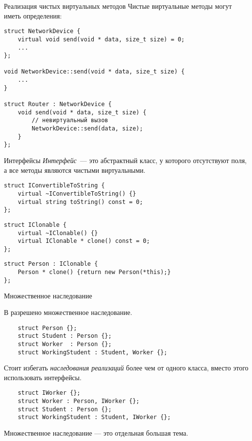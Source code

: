 \documentclass{beamer}
\begin{document}
\begin{frame}[fragile]{Реализация чистых виртуальных методов}
    Чистые виртуальные методы могут иметь определения:
    \begin{lstlisting}[basicstyle=\fontsize{9pt}{1em}\ttfamily,commentstyle=\fontsize{9pt}{1em}\ttfamily\color{MOOCGreen}]
struct NetworkDevice {
    virtual void send(void * data, size_t size) = 0;
    ...
};

void NetworkDevice::send(void * data, size_t size) {
    ...
}

struct Router : NetworkDevice {
    void send(void * data, size_t size) {
        // невиртуальный вызов
        NetworkDevice::send(data, size);
    }
};
    \end{lstlisting}
\end{frame}

\begin{frame}[fragile]{Интерфейсы}{}
    {\em Интерфейс}~— это абстрактный класс, у которого отсутствуют поля,
    а все методы являются чистыми виртуальными.

    \begin{lstlisting}
struct IConvertibleToString {
    virtual ~IConvertibleToString() {}
    virtual string toString() const = 0;
};
    \end{lstlisting}
    \begin{lstlisting}
struct IClonable {
    virtual ~IClonable() {}
    virtual IClonable * clone() const = 0;
};
    \end{lstlisting}
    \begin{lstlisting}
struct Person : IClonable {
    Person * clone() {return new Person(*this);}
};
    \end{lstlisting}
\end{frame}

\begin{frame}[fragile]{Множественное наследование}

    В \langcpp разрешено множественное наследование.
\begin{lstlisting}
    struct Person {};
    struct Student : Person {};
    struct Worker  : Person {};
    struct WorkingStudent : Student, Worker {};
\end{lstlisting}
    Стоит избегать {\em наследования реализаций} более чем от одного 
    класса, вместо этого использовать интерфейсы.

\begin{lstlisting}
    struct IWorker {};
    struct Worker : Person, IWorker {};
    struct Student : Person {};
    struct WorkingStudent : Student, IWorker {};
\end{lstlisting}

Множественное наследование — это отдельная большая тема.
\end{frame}
\end{document}
